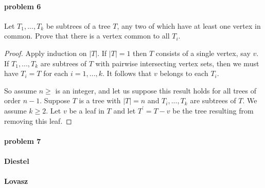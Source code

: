 \paragraph{problem 6}
Let $ T_1,...,T_k $ be subtrees of a tree $ T $, any two of which have at least 
one vertex in common. Prove that there is a vertex common to all $ T_i$.
\begin{proof}
   Apply induction on $ |T| $. If $ |T| = 1 $ then $ T $ consists of a single vertex,
   say $ v$. If $ T_1,...,T_k $ are subtrees of $ T $ with pairwise intersecting
   vertex sets, then we must have $ T_i = T $ for each $ i = 1,...,k$. It follows 
   that $ v $ belongs to each $ T_i$.
   
   \smallskip \noindent
   So assume $ n \geq $ is an integer, and let us suppose this result holds for 
   all trees of order $ n - 1 $. Suppose $ T $ is a tree with $ |T| = n $ and 
   $ T_i,...,T_k $ are subtrees of $ T $. We assume $ k \geq 2 $. Let $ v $ be a 
   leaf in $ T $ and let $ T^\prime = T - v $ be the tree resulting from removing
   this leaf. 
\end{proof}

\paragraph{problem 7}

\paragraph{Diestel}

\paragraph{Lovasz}